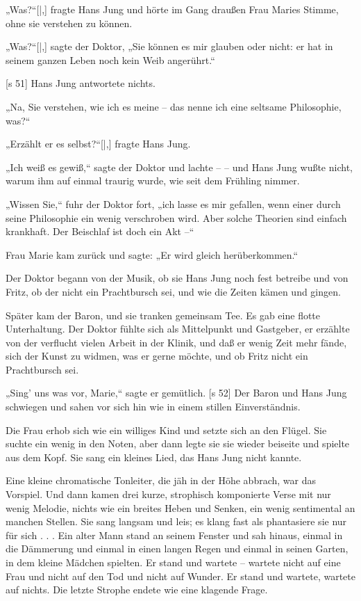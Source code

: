 „Was?“[|,] fragte Hans Jung und hörte im Gang
draußen Frau Maries Stimme, ohne sie verstehen
zu können.

„Was?“[|,] sagte der Doktor, „Sie können es mir
glauben oder nicht: er hat in seinem ganzen Leben
noch kein Weib angerührt.“

[s 51]
Hans Jung antwortete nichts.

„Na, Sie verstehen, wie ich es meine – das
nenne ich eine seltsame Philosophie, was?“

„Erzählt er es selbst?“[|,] fragte Hans Jung.

„Ich weiß es gewiß,“ sagte der Doktor und
lachte – – und Hans Jung wußte nicht, warum
ihm auf einmal traurig wurde, wie seit dem Frühling
nimmer.

„Wissen Sie,“ fuhr der Doktor fort, „ich lasse es
mir gefallen, wenn einer durch seine Philosophie ein
wenig verschroben wird. Aber solche Theorien sind
einfach krankhaft. Der Beischlaf ist doch ein Akt –“

Frau Marie kam zurück und sagte: „Er wird
gleich herüberkommen.“

Der Doktor begann von der Musik, ob sie Hans
Jung noch fest betreibe und von Fritz, ob der nicht
ein Prachtbursch sei, und wie die Zeiten kämen und
gingen.

Später kam der Baron, und sie tranken gemeinsam
Tee. Es gab eine flotte Unterhaltung. Der Doktor
fühlte sich als Mittelpunkt und Gastgeber, er erzählte
von der verflucht vielen Arbeit in der Klinik, und
daß er wenig Zeit mehr fände, sich der Kunst zu
widmen, was er gerne möchte, und ob Fritz nicht ein
Prachtbursch sei.

„Sing' uns was vor, Marie,“ sagte er gemütlich.
[s 52]
Der Baron und Hans Jung schwiegen und sahen vor
sich hin wie in einem stillen Einverständnis.

Die Frau erhob sich wie ein williges Kind und
setzte sich an den Flügel. Sie suchte ein wenig in
den Noten, aber dann legte sie sie wieder beiseite
und spielte aus dem Kopf. Sie sang ein kleines Lied,
das Hans Jung nicht kannte.

Eine kleine chromatische Tonleiter, die jäh in
der Höhe abbrach, war das Vorspiel. Und dann
kamen drei kurze, strophisch komponierte Verse mit
nur wenig Melodie, nichts wie ein breites Heben und
Senken, ein wenig sentimental an manchen Stellen.
Sie sang langsam und leis; es klang fast als phantasiere
sie nur für sich . . . Ein alter Mann stand an seinem
Fenster und sah hinaus, einmal in die Dämmerung
und einmal in einen langen Regen und einmal in seinen
Garten, in dem kleine Mädchen spielten. Er stand
und wartete – wartete nicht auf eine Frau und nicht
auf den Tod und nicht auf Wunder. Er stand und
wartete, wartete auf nichts. Die letzte Strophe endete
wie eine klagende Frage.

